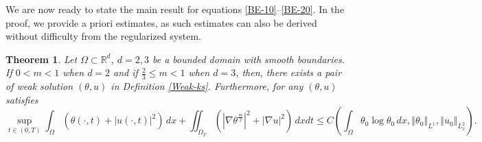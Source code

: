 \documentclass{amsart}
\newtheorem{theorem}[defn]{Theorem}
\numberwithin{equation}{section}
\newcommand{\R}{{ \mathbb{R}  }}
\newcommand{\bke}[1]{\left( #1 \right)}
\newcommand{\norm}[1]{\left\Vert #1 \right\Vert}
\newcommand{\abs}[1]{\left| #1 \right|}
\begin{document}
We are now ready to state the main result for equations \eqref{BE-10}--\eqref{BE-20}. In the proof, we provide a priori estimates, as such estimates can also be derived without difficulty from the regularized system.

\begin{theorem}
Let  $\Omega\subset\R^d$, $d=2,3$ be a bounded domain with smooth boundaries. 
If $0< m <1$ when $d=2$ and if $\frac{2}{3} \le m<1$ when $d=3$, then,
there exists a pair of weak solution $(\theta, u)$ in Definition \ref{Weak-ks}. Furthermore, for any  $(\theta, u)$ satisfies 
\begin{equation}\label{BS-energy}
\sup_{t\in (0, T)} \int_{\Omega} (\theta(\cdot, t) +\abs{u(\cdot, t)}^2) \,dx
+\iint_{\Omega_T} (\left|\nabla \theta^{\frac{m}{2}}\right|^{2} +\abs{\nabla u}^2) \,dxdt\le C\bke{\int_{\Omega}\theta_0 \log \theta_0 \,dx,  \norm{\theta_0}_{L^1}, \norm{u_0}_{L^{2}_{x}}}.
\end{equation}
\end{theorem}
\end{document}
